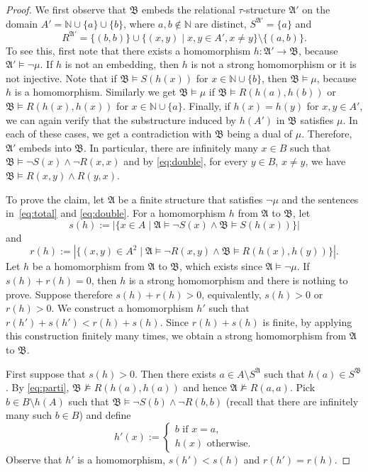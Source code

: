 \documentclass[nonacm]{acmart}
\newcommand{\N}{\mathbb N}
\newcommand{\bA}{{\mathfrak A}}
\newcommand{\bB}{{\mathfrak B}}
\begin{document}
\begin{proof}
We first observe that $\bB$ embeds 
the relational $\tau$-structure $\bA'$ on the domain $A' = \N \cup \{a\} \cup \{b\}$, where $a,b \notin \N$ are distinct, $S^{\bA'} = \{a\}$ and 
\[R^{\bA'} = \{(b,b)\} \cup \{(x,y) \mid x, y \in A', x \neq y\} \setminus \{(a,b)\}  .\]
To see this, first note that
there exists a homomorphism $h \colon \bA' \to \bB$, because 
$\bA' \models \neg \mu$.
If $h$ is not an embedding, then $h$ is not a strong homomorphism or it is not injective. Note that if $\bB \models S(h(x))$ for $x \in \N \cup \{b\}$, then $\bB \models \mu$, because $h$ is a homomorphism. Similarly we get $\bB \models \mu$ if $\bB \models R(h(a), h(b))$ or $\bB \models R(h(x),h(x))$ for $x \in \N \cup \{a\}$. Finally, if $h(x)=h(y)$ for $x,y \in A'$, we can again verify that the substructure induced by $h(A')$ in $\bB$ satisfies $\mu$. In each of these cases, we get a contradiction with $\bB$ being a dual of $\mu$. 
Therefore, $\bA'$ embeds into $\bB$. 
In particular, there are infinitely many $x \in B$ such that $\bB \models \neg S(x) \wedge \neg R(x,x)$ and by \eqref{eq:double}, for every $y \in B$, $x \neq y$, we have $\bB \models R(x,y) \wedge R(y,x)$.

To prove the claim, let $\bA$ be a finite structure that satisfies $\neg \mu$ and the sentences in~\eqref{eq:total} and \eqref{eq:double}. For a homomorphism $h$ from $\bA$ to $\bB$, let 
\[s(h) := |\{x \in A \mid \bA \models \neg S(x) \wedge \bB \models S(h(x)) \} | \]
and 
\[r(h) := |\{(x,y) \in A^2 \mid \bA \models \neg R(x,y) \wedge \bB \models R(h(x), h(y)) \}|.\]
Let $h$ be a homomorphism from $\bA$ to $\bB$, which exists since $\bA \models \neg \mu$. 
If $s(h)+r(h)=0$, then $h$ is a strong homomorphism and there is nothing to prove. Suppose therefore $s(h)+r(h)>0$, equivalently, $s(h)>0$ or $r(h)>0$. We construct a homomorphism $h'$ such that $r(h')+s(h')<r(h)+s(h)$. Since $r(h)+s(h)$ is finite, by applying this construction finitely many times, we obtain a strong homomorphism from $\bA$ to $\bB$.

First suppose that $s(h)>0$. Then there exists $a \in A \setminus S^{\bA}$ such that $h(a) \in S^{\bB}$. By \eqref{eq:parti}, $\bB \not \models R(h(a),h(a))$ and hence $\bA \not \models R(a,a)$. Pick $b \in B \setminus h(A)$ such that $\bB \models \neg S(b) \wedge \neg R(b,b)$ (recall that there are infinitely many such $b \in B$) and define
\[
h'(x):=
\begin{cases}
b \text{ if }x=a,\\
h(x) \text{ otherwise}.
\end{cases}
\]
Observe that $h'$ is a homomorphism, $s(h')<s(h)$ and $r(h')=r(h)$.


\end{proof}
\end{document}
